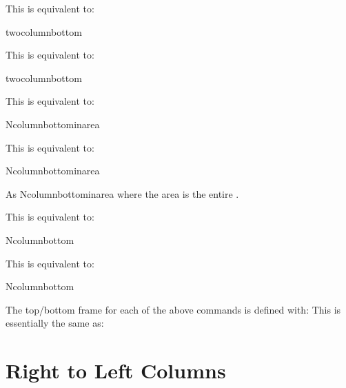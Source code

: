 \documentclass[fontsize=12pt]{scrbook}
\begin{document}
This is equivalent to: 
\begin{compactcodebox}
\gls{twocolumnbottom}
\end{compactcodebox}

This is equivalent to: 
\begin{compactcodebox}
\gls{twocolumnbottom}
\end{compactcodebox}

This is equivalent to: 
\begin{compactcodebox}
\gls{Ncolumnbottominarea}
\end{compactcodebox}

This is equivalent to: 
\begin{compactcodebox}
\gls{Ncolumnbottominarea}
\end{compactcodebox}

As \gls{Ncolumnbottominarea} where the area is the entire .

This is equivalent to: 
\begin{compactcodebox}
\gls{Ncolumnbottom}
\end{compactcodebox}

This is equivalent to: 
\begin{compactcodebox}
\gls{Ncolumnbottom}
\end{compactcodebox}

The top\slash bottom frame for each of the above commands is defined
with:
This is essentially the same as:
\begin{compactcodebox}
\end{compactcodebox}

\section{Right to Left Columns}
\label{sec:RL}
\end{document}
